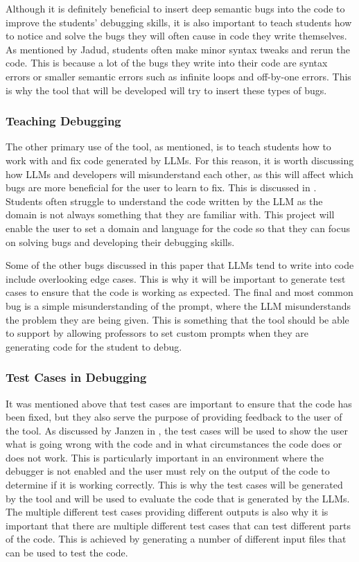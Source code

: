 \documentclass[12pt]{extarticle}
\begin{document}
Although it is definitely beneficial to insert deep semantic bugs into the code to improve the students' debugging skills, it is also important to teach students how to notice and solve the bugs they will often cause in code they write themselves. As mentioned by Jadud, students often make minor syntax tweaks and rerun the code. This is because a lot of the bugs they write into their code are syntax errors or smaller semantic errors such as infinite loops and off-by-one errors. This is why the tool that will be developed will try to insert these types of bugs.

\subsubsection{Teaching Debugging}

The other primary use of the tool, as mentioned, is to teach students how to work with and fix code generated by LLMs. For this reason, it is worth discussing how LLMs and developers will misunderstand each other, as this will affect which bugs are more beneficial for the user to learn to fix. This is discussed in \cite{nguyen2024}. Students often struggle to understand the code written by the LLM as the domain is not always something that they are familiar with. This project will enable the user to set a domain and language for the code so that they can focus on solving bugs and developing their debugging skills. 

Some of the other bugs discussed in this paper that LLMs tend to write into code include overlooking edge cases. This is why it will be important to generate test cases to ensure that the code is working as expected. The final and most common bug is a simple misunderstanding of the prompt, where the LLM misunderstands the problem they are being given. This is something that the tool should be able to support by allowing professors to set custom prompts when they are generating code for the student to debug.

\subsubsection{Test Cases in Debugging}

It was mentioned above that test cases are important to ensure that the code has been fixed, but they also serve the purpose of providing feedback to the user of the tool. As discussed by Janzen in \cite{Janzen2008}, the test cases will be used to show the user what is going wrong with the code and in what circumstances the code does or does not work. This is particularly important in an environment where the debugger is not enabled and the user must rely on the output of the code to determine if it is working correctly. This is why the test cases will be generated by the tool and will be used to evaluate the code that is generated by the LLMs. The multiple different test cases providing different outputs is also why it is important that there are multiple different test cases that can test different parts of the code. This is achieved by generating a number of different input files that can be used to test the code.
\end{document}
